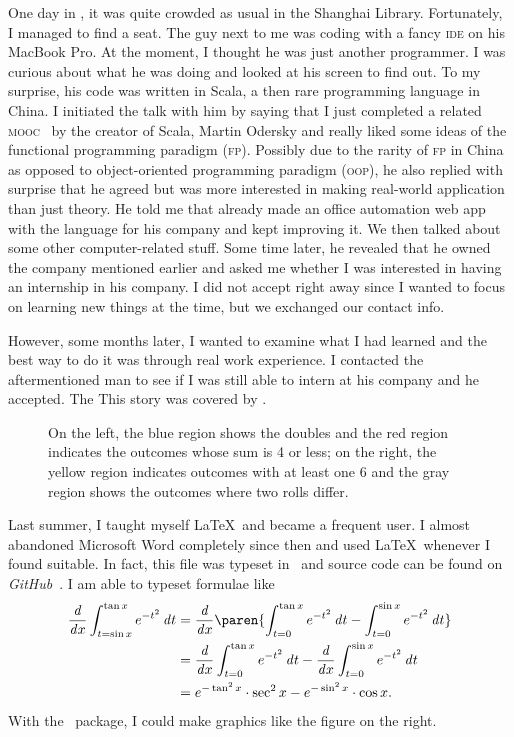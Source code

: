 	One day in , it was quite crowded as usual in the Shanghai Library.
	Fortunately, I managed to find a seat. The guy next to me was coding with a
	fancy \textsc{ide} on his MacBook Pro. At the moment, I thought he was just
	another programmer. I was curious about what he was doing and looked at his
	screen to find out. To my surprise, his code was written in Scala, a then rare
	programming language in China. I initiated the talk with him by saying that I
	just completed a related \textsc{mooc}~\cite{FPPS} by the creator of Scala,
	Martin Odersky and really liked some ideas of the functional programming
	paradigm (\textsc{fp}). Possibly due to the rarity of \textsc{fp} in China as
	opposed to object-oriented programming paradigm (\textsc{oop}), he also replied
	with surprise that he agreed but was more interested in making real-world
	application than just theory. He told me that already made an office automation
	web app with the language for his company and kept improving it. We then talked
	about some other computer-related stuff. Some time later, he revealed that he
	owned the company mentioned earlier and asked me whether I was interested in
	having an internship in his company. I did not accept right away since I wanted
	to focus on learning new things at the time, but we exchanged our contact info.
	
	However, some months later, I wanted to examine what I had learned and the best way to do it was through real work experience. I contacted the aftermentioned man to see if I was still able to intern at his company and he accepted.
	The This story was covered by .
	
	\begin{wrapfigure}[8]{r}[.6in]{.4\textwidth}
		\scalebox{.4}{  }
		\caption{On the left, the blue region shows the doubles and the red region
			indicates the outcomes whose sum is 4 or less; on the right, the yellow region
			indicates outcomes with at least one 6 and the gray region shows the outcomes
			where two rolls differ.}
		\label{fig:CondProbEx}
	\end{wrapfigure}
	
	Last summer, I taught myself \LaTeX\ and became a frequent user. I almost
	abandoned Microsoft Word completely since then and used \LaTeX\ whenever I found
	suitable. In fact, this file was typeset in \LuaLaTeX\ and source code can be
	found on \textit{GitHub}~\cite{Readmission}. I am able to typeset formulae like
	\begin{align*}
	\dd x \int_{t=\sin x}^{\tan x} e^{-t^2} \dt
		&= \dd x \paren{\int_{t=0}^{\tan x} e^{-t^2} \dt -
			\int_{t=0}^{\sin x} e^{-t^2} \dt} \\
		&= \dd x \int_{t=0}^{\tan x} e^{-t^2} \dt
			- \dd x \int_{t=0}^{\sin x} e^{-t^2} \dt \\
		&= e^{-\tan^2 x} \cdot \sec^2 x - e^{-\sin^2 x} \cdot \cos x.
	\end{align*}
	With the \TikZ\ package, I could make graphics like the figure on the right.
	
